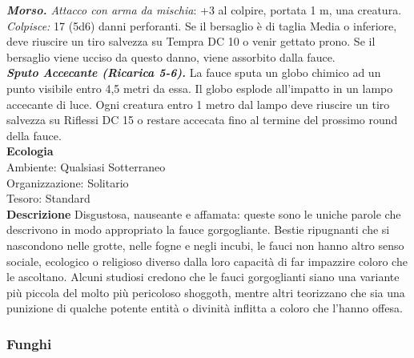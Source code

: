\begin{multicols}{2}
\emph{\textbf{Morso.} Attacco con arma da mischia}: +3 al colpire, portata 1 m, una creatura.\\
\emph{Colpisce:} 17 (5d6) danni perforanti. Se il bersaglio è di taglia Media o inferiore, deve riuscire un tiro salvezza su Tempra DC 10 o venir gettato prono. Se il bersaglio viene ucciso da questo danno, viene assorbito dalla fauce.\\
\emph{\textbf{Sputo Accecante (Ricarica 5-6).}} La fauce sputa un globo chimico ad un punto visibile entro 4,5 metri da essa. Il globo esplode all'impatto in un lampo accecante di luce. Ogni creatura entro 1 metro dal lampo deve riuscire un tiro salvezza su Riflessi DC  15 o restare accecata fino al termine del prossimo round della fauce.\\
\textbf{Ecologia}\\
Ambiente: Qualsiasi Sotterraneo\\
Organizzazione: Solitario\\
Tesoro: Standard\\
\textbf{Descrizione}
Disgustosa, nauseante e affamata: queste sono le uniche parole che descrivono in modo appropriato la fauce gorgogliante. Bestie ripugnanti che si nascondono nelle grotte, nelle fogne e negli incubi, le fauci non hanno altro senso sociale, ecologico o religioso diverso dalla loro capacità di far impazzire coloro che le ascoltano. Alcuni studiosi credono che le fauci gorgoglianti siano una variante più piccola del molto più pericoloso shoggoth, mentre altri teorizzano che sia una punizione di qualche potente entità o divinità inflitta a coloro che l'hanno offesa.\\


\subsubsection{Funghi}


\end{multicols}
